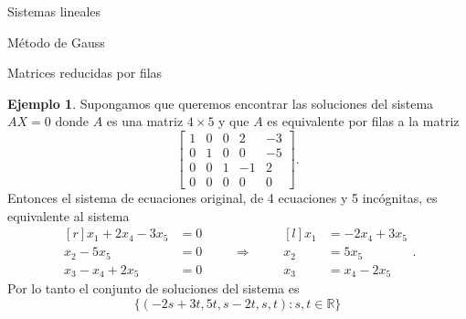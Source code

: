 \documentclass[a4paper,12pt,twoside,spanish,reqno]{amsbook}
\theoremstyle{definition}
\newtheorem{ejemplo}{Ejemplo}[section]
\theoremstyle{remark}
\newcommand{\R}{\mathbb R}
\begin{document}
\begin{chapter}{Sistemas lineales}
\begin{section}{Método de Gauss }
\begin{subsection}{Matrices reducidas por filas}
                \begin{ejemplo}
                    Supongamos que queremos encontrar las soluciones del sistema $AX = 0$ donde $A$ es una matriz $4 \times 5$ y que $A$ es equivalente por filas a la matriz
                    \begin{equation*}
                    \begin{bmatrix} 1&0&0&2&-3 \\ 0&1&0&0&-5 \\ 0&0&1&-1&2 \\ 0&0&0&0&0\end{bmatrix}.
                    \end{equation*} 
                    Entonces el sistema de ecuaciones original, de 4 ecuaciones y 5 incógnitas,  es equivalente al sistema
                    \begin{equation*}
                    \begin{matrix*}[r]
                    x_1 +2x_4 -3x_5 &= 0 \\ x_2 -5x_5 &= 0 \\ x_3-x_4+2x_5 &= 0
                    \end{matrix*} 
                    \qquad \Rightarrow \qquad 
                    \begin{matrix*}[l]
                    x_1  &= -2x_4 +3x_5 \\ x_2  &= 5x_5 \\ x_3 &= x_4-2x_5
                    \end{matrix*}. 
                    \end{equation*}
                    Por  lo tanto el conjunto de soluciones del sistema es
                    \begin{equation*}
                    \{(-2s +3t,  5t,  s-2t, s, t): s,t \in \R\}
                    \end{equation*}
                \end{ejemplo}   
            \end{subsection}
            

\end{section}
\end{chapter}
\end{document}
